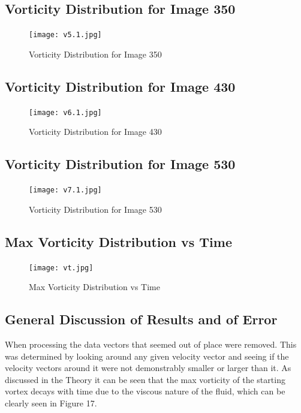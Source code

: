 \documentclass[12pt]{article}
\begin{document}
    \newpage
    \subsection{Vorticity Distribution for Image 350}
    \begin{figure}[h]
    \texttt{[image: v5.1.jpg]}
    \centering
    \caption{Vorticity Distribution for Image 350}
    \end{figure}
        
    \newpage
    \subsection{Vorticity Distribution for Image 430}
    \begin{figure}[h]
    \texttt{[image: v6.1.jpg]}
    \centering
    \caption{Vorticity Distribution for Image 430}
    \end{figure}
        
    \newpage
    \subsection{Vorticity Distribution for Image 530}
    \begin{figure}[h]
    \texttt{[image: v7.1.jpg]}
    \centering
    \caption{Vorticity Distribution for Image 530}
    \end{figure}


    \newpage
    \subsection{Max Vorticity Distribution vs Time}
    \begin{figure}[h]
    \texttt{[image: vt.jpg]}
    \centering
    \caption{Max Vorticity Distribution vs Time}
    \end{figure}

\subsection{General Discussion of Results and of Error}
When processing the data vectors that seemed out of place were removed. This was determined by looking around any given velocity vector and seeing if the velocity vectors around it were not demonstrably smaller or larger than it. As discussed in the Theory it can be seen that the max vorticity of the starting vortex decays with time due to the viscous nature of the fluid, which can be clearly seen in Figure 17.
\end{document}
